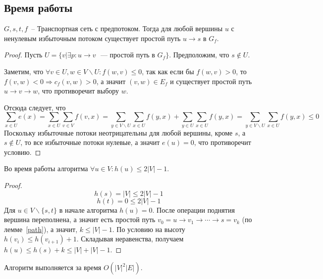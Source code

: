 \subsection{Время работы}
\begin{lemma}\label{path}
	$G,s,t,f$~-- Транспортная сеть с предпотоком. Тогда для любой вершины $u$ с ненулевым избыточным потоком существует простой путь $u\to s$ в $G_f$.
\end{lemma}
\begin{proof}
	Пусть $U=\{v|\exists p\colon u\to v\text{ ~--- простой путь в }G_f\}$. Предположим, что $s\not\in U$.

	Заметим, что $\forall v\in U, w\in V\smallsetminus U\colon f(w,v)\le 0$, так как если бы $f(w,v)>0$, то $f(v,w)<0\Rightarrow c_f(v,w)>0$, а значит $(v,w)\in E_f$ и существует простой путь $u\to v\to w$, что противоречит выбору $w$.

	Отсюда следует, что
	$$
	\sum_{x\in U}e(x)=\sum_{x\in U}\sum_{v\in V}f(v,x)=\sum_{y\in V\smallsetminus U}\sum_{x\in U}f(y,x)+\sum_{y\in U}\sum_{x\in U}f(y,x)=\sum_{y\in V\smallsetminus U}\sum_{x\in U}f(y,x)\le 0
	$$
	Поскольку избыточные потоки неотрицательны для любой вершины, кроме $s$, а $s\not\in U$, то все избыточные потоки нулевые, а значит $e(u)=0$, что противоречит условию.
\end{proof}
\begin{lemma}
	Во время работы алгоритма $\forall u\in V\colon h(u)\le 2|V|-1$.
\end{lemma}
\begin{proof}
	$$h(s)=|V|\le 2|V|-1$$
	$$h(t)=0\le 2|V|-1$$
	Для $u\in V\smallsetminus\{s,t\}$ в начале алгоритма $h(u)=0$. После операции поднятия вершина переполнена, а значит есть простой путь $v_0=u\to v_1\to\cdots\to s=v_k$ (по лемме~\ref{path}), а значит, $k\le |V|-1$. По условию на высоту $h(v_i)\le h(v_{i+1})+1$. Складывая неравенства, получаем $h(u)\le h(s)+k\le |V|+|V|-1$.
\end{proof}
\begin{theorem}
	Алгоритм выполняется за время $O(|V|^2|E|)$.
\end{theorem}
